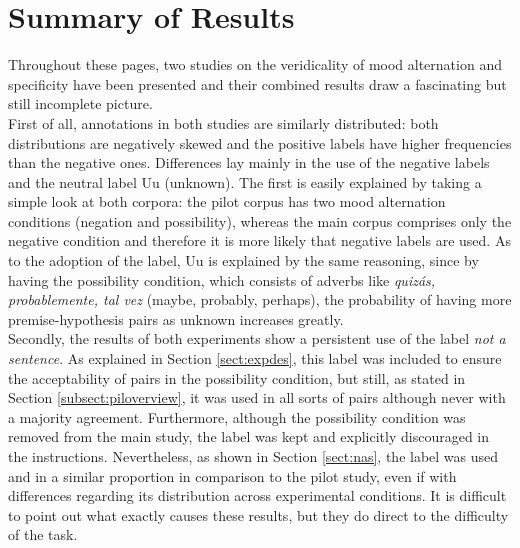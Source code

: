 \label{chap:con}
\section{Summary of Results}
Throughout these pages, two studies on the veridicality of mood alternation and specificity have been presented and their combined results draw a fascinating but still incomplete picture.\\

First of all, annotations in both studies are similarly distributed: both distributions are negatively skewed and the positive labels have higher frequencies than the negative ones. Differences lay mainly in the use of the negative labels and the neutral label Uu (unknown). The first is easily explained by taking a simple look at both corpora: the pilot corpus has two mood alternation conditions (negation and possibility), whereas the main corpus comprises only the negative condition and therefore it is more likely that negative labels are used. As to the adoption of the label, Uu is explained by the same reasoning, since by having the possibility condition, which consists of adverbs like \textit{quizás, probablemente, tal vez} (maybe, probably, perhaps), the probability of having more premise-hypothesis pairs as unknown increases greatly.\\

Secondly, the results of both experiments show a persistent use of the label \textit{not a sentence}. As explained in Section \ref{sect:expdes}, this label was included to ensure the acceptability of pairs in the possibility condition, but still, as stated in Section \ref{subsect:piloverview}, it was used in all sorts of pairs although never with a majority agreement. Furthermore, although the possibility condition was removed from the main study, the label was kept and explicitly discouraged in the instructions. Nevertheless, as shown in Section \ref{sect:nas}, the label was used and in a similar proportion in comparison to the pilot study, even if with differences regarding its distribution across experimental conditions. It is difficult to point out what exactly causes these results, but they do direct to the difficulty of the task.\\

